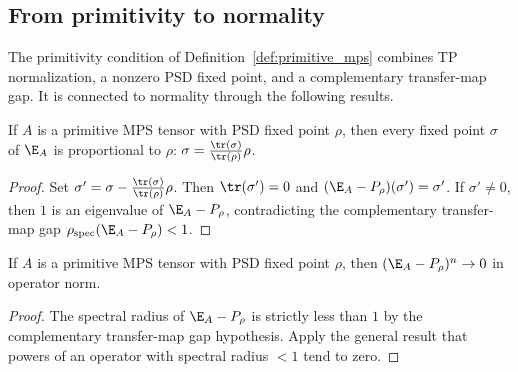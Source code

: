 \subsection{From primitivity to normality}\label{subsec:prim_to_normal}

The primitivity condition of Definition~\ref{def:primitive_mps}
combines TP normalization, a nonzero PSD fixed point, and a complementary
transfer-map gap. It is connected to normality through the following results.

\begin{lemma}%
    \label{lem:fixedpoint_unique_spectral}
    \leanok
    If $A$ is a primitive MPS tensor
    with PSD fixed point $\rho$,
    then every fixed point $\sigma$ of $\E_A$ is proportional
    to $\rho$: $\sigma = \frac{\tr(\sigma)}{\tr(\rho)} \rho$.
\end{lemma}

\begin{proof}\leanok
    Set $\sigma' = \sigma - \frac{\tr(\sigma)}{\tr(\rho)} \rho$.
    Then $\tr(\sigma') = 0$ and $(\E_A - P_\rho)(\sigma') = \sigma'$.
    If $\sigma' \neq 0$, then $1$ is an eigenvalue of $\E_A - P_\rho$,
    contradicting the complementary transfer-map gap
    $\rho_{\mathrm{spec}}(\E_A - P_\rho) < 1$.
\end{proof}

\begin{lemma}%
    \label{lem:complement_pow_zero}
    \leanok
    If $A$ is a primitive MPS tensor with PSD fixed point $\rho$,
    then $(\E_A - P_\rho)^n \to 0$ in operator norm.
\end{lemma}

\begin{proof}\leanok
    The spectral radius of $\E_A - P_\rho$ is strictly less
    than $1$ by the complementary transfer-map gap hypothesis.
    Apply the general result that powers of an operator
    with spectral radius $< 1$ tend to zero.
\end{proof}

